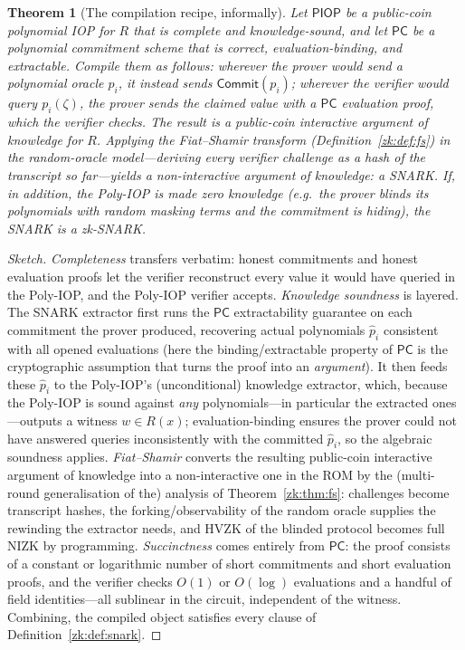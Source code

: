 \documentclass[11pt,a4paper]{article}
\newtheorem{theorem}{Theorem}[section]
\theoremstyle{definition}
\theoremstyle{remark}
\begin{document}
\begin{theorem}[The compilation recipe, informally]\label{zk:thm:recipe}
Let \(\mathsf{PIOP}\) be a public-coin polynomial IOP for \(R\) that is complete and knowledge-sound, and let \(\mathsf{PC}\) be a polynomial commitment scheme that is correct, evaluation-binding, and extractable. Compile them as follows: wherever the prover would send a polynomial oracle \(p_i\), it instead sends \(\mathsf{Commit}(p_i)\); wherever the verifier would query \(p_i(\zeta)\), the prover sends the claimed value with a \(\mathsf{PC}\) evaluation proof, which the verifier checks. The result is a public-coin \emph{interactive argument of knowledge} for \(R\). Applying the Fiat--Shamir transform (Definition~\ref{zk:def:fs}) in the random-oracle model---deriving every verifier challenge as a hash of the transcript so far---yields a non-interactive argument of knowledge: a \emph{SNARK}. If, in addition, the Poly-IOP is made zero knowledge (e.g.\ the prover blinds its polynomials with random masking terms and the commitment is hiding), the SNARK is a \emph{zk-SNARK}.
\end{theorem}

\begin{proof}[Sketch]
\emph{Completeness} transfers verbatim: honest commitments and honest evaluation proofs let the verifier reconstruct every value it would have queried in the Poly-IOP, and the Poly-IOP verifier accepts. \emph{Knowledge soundness} is layered. The SNARK extractor first runs the \(\mathsf{PC}\) extractability guarantee on each commitment the prover produced, recovering actual polynomials \(\hat p_i\) consistent with all opened evaluations (here the binding/extractable property of \(\mathsf{PC}\) is the cryptographic assumption that turns the proof into an \emph{argument}). It then feeds these \(\hat p_i\) to the Poly-IOP's (unconditional) knowledge extractor, which, because the Poly-IOP is sound against \emph{any} polynomials---in particular the extracted ones---outputs a witness \(w \in R(x)\); evaluation-binding ensures the prover could not have answered queries inconsistently with the committed \(\hat p_i\), so the algebraic soundness applies. \emph{Fiat--Shamir} converts the resulting public-coin interactive argument of knowledge into a non-interactive one in the ROM by the (multi-round generalisation of the) analysis of Theorem~\ref{zk:thm:fs}: challenges become transcript hashes, the forking/observability of the random oracle supplies the rewinding the extractor needs, and HVZK of the blinded protocol becomes full NIZK by programming. \emph{Succinctness} comes entirely from \(\mathsf{PC}\): the proof consists of a constant or logarithmic number of short commitments and short evaluation proofs, and the verifier checks \(O(1)\) or \(O(\log)\) evaluations and a handful of field identities---all sublinear in the circuit, independent of the witness. Combining, the compiled object satisfies every clause of Definition~\ref{zk:def:snark}.
\end{proof}
\end{document}
